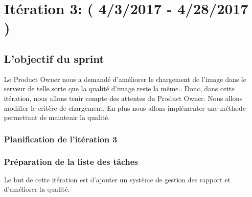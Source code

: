 \section{Itération 3: ( 4/3/2017 - 4/28/2017 )}

\subsection{L'objectif du sprint}
Le Product Owner nous a demandé d’améliorer le chargement de l'image 
dans le serveur de telle sorte que la qualité d'image reste la même..
Donc, dans cette itération, nous allons tenir compte des attentes du Product Owner. Nous allons
modifier le critère de chargement, En plus nous allons implémenter une méthode
permettant de maintenir la qualité.

\subsubsection{Planification de l'itération 3}

\subsubsection{Préparation de la liste des tâches}

Le but de cette itération est d'ajouter un système de gestion des rapport et d'améliorer
la qualité.

